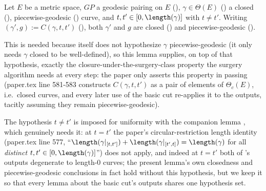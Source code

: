 \begin{lemma}
  Let $E$ be a metric space, $GP$ a geodesic pairing on $E$ (), $\gamma \in
  \Theta(E)$ () a closed (), piecewise-geodesic
  () curve, and $t,t' \in [0,\length(\gamma)]$ with $t \ne t'$. Writing
  $(\gamma',g) := C(\gamma,t,t')$ (), both $\gamma'$ and $g$ are closed
  () and piecewise-geodesic ().

  This is needed because  itself does not hypothesize $\gamma$ piecewise-geodesic
  (it only needs $\gamma$ closed to be well-defined), so this lemma supplies, on top of that
  hypothesis, exactly the closure-under-the-surgery-class property the surgery algorithm needs at
  every step: the paper only asserts this property in passing (paper.tex line 581-583 constructs
  $C(\gamma,t,t')$ as a pair of elements of $\Theta_c(E)$, i.e.\ closed curves, and every later use
  of the basic cut re-applies it to the outputs, tacitly assuming they remain piecewise-geodesic).

  The hypothesis $t \ne t'$ is imposed for uniformity with the companion lemma
  , which genuinely needs it: at $t = t'$ the paper's circular-restriction
  length identity (paper.tex line 577, ``$\length(\gamma|_{[t,t']}) + \length(\gamma|_{[t',t]}) =
  \length(\gamma)$ for all \emph{distinct} $t,t' \in [0,\length(\gamma)]$'') does not apply, and
  indeed at $t=t'$ both of 's outputs degenerate to length-$0$ curves; the present
  lemma's own closedness and piecewise-geodesic conclusions in fact hold without this hypothesis,
  but we keep it so that every lemma about the basic cut's outputs shares one hypothesis set.
\end{lemma}
